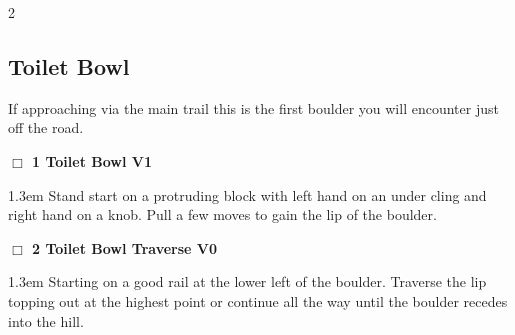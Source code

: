 \begin{multicols}{2}
\subsection*{Toilet Bowl}\label{bf:Toilet Bowl}
If approaching via the main trail this is the first boulder you will encounter just off the road.\\
\needspace{2em}
\label{rt:Toilet Bowl}
\colorbox{green!20}{
\parbox{0.95\linewidth}{
\hspace{-1ex}\textbf{$\Box$
1 Toilet Bowl V1  
}}}
\begin{adjustwidth}{1.3em}{}			
Stand start on a protruding block with left hand on an under cling and right hand on a knob. Pull a few moves to gain the lip of the boulder.
\end{adjustwidth}
\needspace{2em}
\label{rt:Toilet Bowl Traverse}
\colorbox{green!20}{
\parbox{0.95\linewidth}{
\hspace{-1ex}\textbf{$\Box$
2 Toilet Bowl Traverse V0  
}}}
\begin{adjustwidth}{1.3em}{}			
Starting on a good rail at the lower left of the boulder. Traverse the lip topping out at the highest point or continue all the way until the boulder recedes into the hill.
\end{adjustwidth}
\needspace{10em}

\end{multicols}
